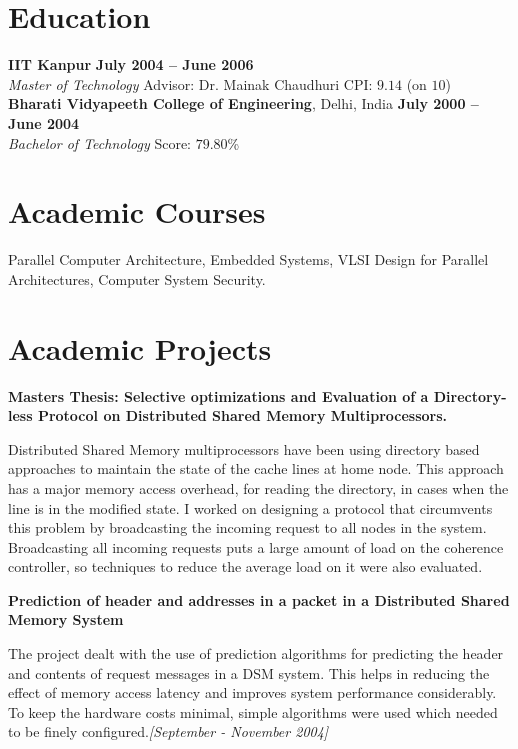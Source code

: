 \documentclass[margin,line]{resume}
\begin{document}
\begin{resume}
	\section{\mysidestyle Education}

	\textbf{IIT Kanpur} \hfill \textbf{July 2004 -- June 2006}\\
	\textsl{Master of Technology} \hfill Advisor:  Dr. Mainak Chaudhuri \hfill CPI: $9.14$ (on $10$)\vspace{2mm}\\%
	\textbf{Bharati Vidyapeeth College of Engineering}, Delhi, India \hfill \textbf{July 2000 -- June 2004}\\
	\textsl{Bachelor of Technology} \hfill Score: $79.80$\%

	\section{\mysidestyle Academic Courses}
	Parallel Computer Architecture, Embedded Systems, VLSI Design for Parallel Architectures, Computer System Security.

	\section{\mysidestyle Academic Projects}

	\textbf{Masters Thesis: Selective optimizations and Evaluation of a Directory-less Protocol on Distributed Shared Memory Multiprocessors.}

	Distributed Shared Memory multiprocessors have been using directory based approaches to maintain the state of the cache lines at home node. This approach has a major memory access overhead, for reading the directory, in cases when the line is in the modified state. I worked on designing a protocol that circumvents this problem by broadcasting the incoming request to all nodes in the system. Broadcasting all incoming requests puts a large amount of load on the coherence controller, so techniques to reduce the average load on it were also evaluated.

	\textbf{Prediction of header and addresses in a packet in a Distributed Shared Memory System}

	The project dealt with the use of prediction algorithms for predicting the header and contents of request messages in a DSM system. This helps in reducing the effect of memory access latency and improves system performance considerably. To keep the hardware costs minimal, simple algorithms were used which needed to be finely configured.\hfill \emph{[September - November 2004]}

	\end{resume}
	
\end{document}
